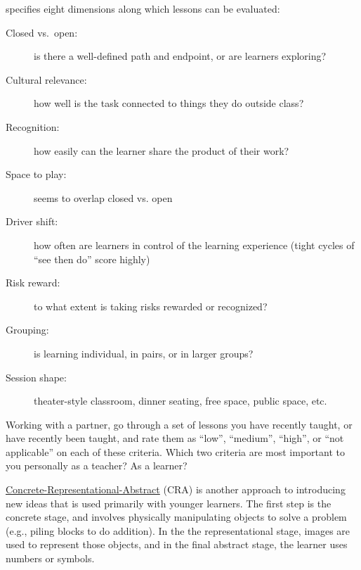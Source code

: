 \cite{Mart2017} specifies eight dimensions along which lessons can be
evaluated:

\begin{description}

  \item[Closed vs.\ open:] is there a well-defined path and endpoint,
    or are learners exploring?

  \item[Cultural relevance:] how well is the task connected to things
    they do outside class?

  \item[Recognition:] how easily can the learner share the product of
    their work?

  \item[Space to play:] seems to overlap closed vs. open

  \item[Driver shift:] how often are learners in control of the
    learning experience (tight cycles of ``see then do'' score highly)

  \item[Risk reward:] to what extent is taking risks rewarded or
    recognized?

  \item[Grouping:] is learning individual, in pairs, or in larger
    groups?

  \item[Session shape:] theater-style classroom, dinner seating, free
    space, public space, etc.

\end{description}

Working with a partner, go through a set of lessons you have recently
taught, or have recently been taught, and rate them as ``low'',
``medium'', ``high'', or ``not applicable'' on each of these criteria.
Which two criteria are most important to you personally as a teacher?
As a learner?


\href{https://makingeducationfun.wordpress.com/2012/04/29/concrete-representational-abstract-cra/}{Concrete-Representational-Abstract}
(CRA) is another approach to introducing new ideas that is used
primarily with younger learners.  The first step is the concrete
stage, and involves physically manipulating objects to solve a problem
(e.g., piling blocks to do addition).  In the the representational
stage, images are used to represent those objects, and in the final
abstract stage, the learner uses numbers or symbols.

